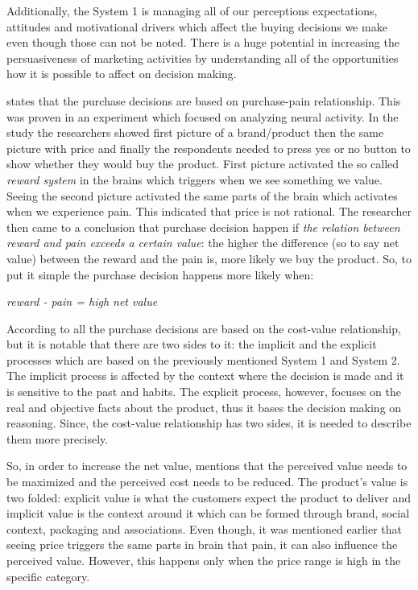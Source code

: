 Additionally, the System 1 is managing all of our perceptions expectations, attitudes and motivational drivers which affect the buying decisions we make even though those can not be noted. There is a huge potential in increasing the persuasiveness of marketing activities by understanding all of the opportunities how it is possible to affect on decision making. \parencite{Decoded:2013}

\textcite{Decoded:2013} states that the purchase decisions are based on purchase-pain relationship. This was proven in an experiment which focused on analyzing neural activity. In the study the researchers showed first picture of a brand/product then the same picture with price and finally the respondents needed to press yes or no button to show whether they would buy the product. First picture activated the so called \emph{reward system} in the brains which triggers when we see something we value. Seeing the second picture activated the same parts of the brain which activates when we experience pain. This indicated that price is not rational. The researcher then came to a conclusion that purchase decision happen if \emph{the relation between reward and pain exceeds a certain value}: the higher the difference (so to say net value) between the reward and the pain is, more likely we buy the product. So, to put it simple the purchase decision happens more likely when: \begin{center}\emph{reward - pain = high net value}\end{center}

According to \textcite{Decoded:2013} all the purchase decisions are based on the cost-value relationship, but it is notable that there are two sides to it: the implicit and the explicit processes which are based on the previously mentioned System 1 and System 2. The implicit process is affected by the context where the decision is made and it is sensitive to the past and habits. The explicit process, however, focuses on the real and objective facts about the product, thus it bases the decision making on reasoning. Since, the cost-value relationship has two sides, it is needed to describe them more precisely.

So, in order to increase the net value, \textcite{Decoded:2013} mentions that the perceived value needs to be maximized and the perceived cost needs to be reduced. The product's value is two folded: explicit value is what the customers expect the product to deliver and implicit value is the context around it which can be formed through brand, social context, packaging and associations. Even though, it was mentioned earlier that seeing price triggers the same parts in brain that pain, it can also influence the perceived value. However, this happens only when the price range is high in the specific category.

